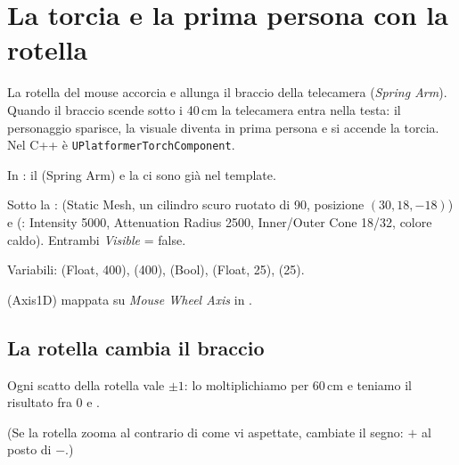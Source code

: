 \section{La torcia e la prima persona con la rotella}

La rotella del mouse accorcia e allunga il braccio della telecamera (\emph{Spring Arm}). Quando il braccio scende sotto i 40\,cm la telecamera entra nella testa: il personaggio sparisce, la visuale diventa in prima persona e si accende la torcia. Nel C++ è \texttt{UPlatformerTorchComponent}.

\begin{ricetta}
  \item In : il  (Spring Arm) e la  ci sono già nel template.
  \item Sotto la :  (Static Mesh, un cilindro scuro ruotato di 90\textdegree, posizione $(30, 18, -18)$) e  (: Intensity 5000, Attenuation Radius 2500, Inner/Outer Cone 18\textdegree/32\textdegree, colore caldo). Entrambi \emph{Visible} = false.
  \item Variabili:  (Float, 400),  (400),  (Bool),  (Float, 25),  (25).
  \item {} (Axis1D) mappata su \emph{Mouse Wheel Axis} in .
\end{ricetta}

\subsection{La rotella cambia il braccio}

Ogni scatto della rotella vale $\pm 1$: lo moltiplichiamo per 60\,cm e teniamo il risultato fra 0 e .

\begin{bpgraph}
\end{bpgraph}
(Se la rotella zooma al contrario di come vi aspettate, cambiate il segno: $+$ al posto di $-$.)

